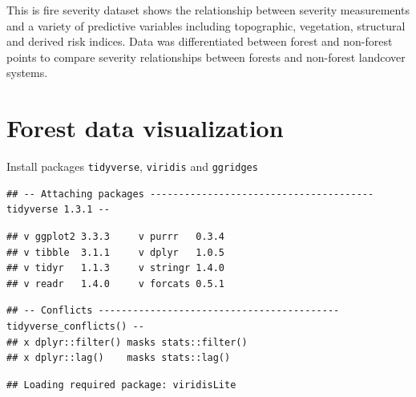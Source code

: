 \documentclass[]{book}
\begin{document}
This is fire severity dataset shows the relationship between severity measurements and a variety of predictive variables
including topographic, vegetation, structural and derived risk indices.
Data was differentiated between forest and non-forest points to compare severity relationships between forests and non-forest
landcover systems.

\hypertarget{dataviz}{%
\chapter{Forest data visualization}\label{dataviz}}

Install packages \texttt{tidyverse}, \texttt{viridis} and \texttt{ggridges}

\begin{verbatim}
## -- Attaching packages --------------------------------------- tidyverse 1.3.1 --
\end{verbatim}

\begin{verbatim}
## v ggplot2 3.3.3     v purrr   0.3.4
## v tibble  3.1.1     v dplyr   1.0.5
## v tidyr   1.1.3     v stringr 1.4.0
## v readr   1.4.0     v forcats 0.5.1
\end{verbatim}

\begin{verbatim}
## -- Conflicts ------------------------------------------ tidyverse_conflicts() --
## x dplyr::filter() masks stats::filter()
## x dplyr::lag()    masks stats::lag()
\end{verbatim}

\begin{verbatim}
## Loading required package: viridisLite
\end{verbatim}
\end{document}
